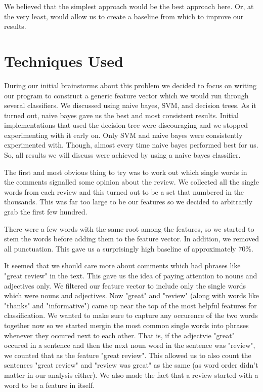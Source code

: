 \documentclass[]{report}
\begin{document}
We believed that the simplest approach would be the best approach here.  Or, at the very least, would allow us to create a baseline from which to improve our results. 

\section{Techniques Used}

During our initial brainstorms about this problem we decided to focus on writing our program to construct a generic feature vector which we would run through several classifiers.  We discussed using naive bayes, SVM, and decision trees.  As it turned out, naive bayes gave us the best and most consistent results.  Initial implementations that used the decision tree were discouraging and we stopped experimenting with it early on.  Only SVM and naive bayes were consistently experimented with.  Though, almost every time naive bayes performed best for us.  So, all results we will discuss were achieved by using a naive bayes classifier.

The first and most obvious thing to try was to work out which single words in the comments signalled some opinion about the review.  We collected all the single words from each review and this turned out to be a set that numbered in the thousands.  This was far too large to be our features so we decided to arbitrarily grab the first few hundred.  

There were a few words with the same root among the features, so we started to stem the words before adding them to the feature vector.  In addition, we removed all punctuation.  This gave us a surprisingly high baseline of approximately 70\%.

It seemed that we should care more about comments which had phrases like "great review" in the text.  This gave us the idea of paying attention to nouns and adjectives only.  We filtered our feature vector to include only the single words which were nouns and adjectives.  Now "great" and "review" (along with words like "thanks" and "informative") came up near the top of the most helpful features for classification.  We wanted to make sure to capture any occurence of the two words together now so we started mergin the most common single words into phrases whenever they occured next to each other.  That is, if the adjectvie "great" occured in a sentence and then the next noun word in the sentence was "review", we counted that as the feature "great review".  This allowed us to also count the sentences "great review" and "review was great" as the same (as word order didn't matter in our analysis either).  We also made the fact that a review started with a word to be a feature in itself.
\end{document}
